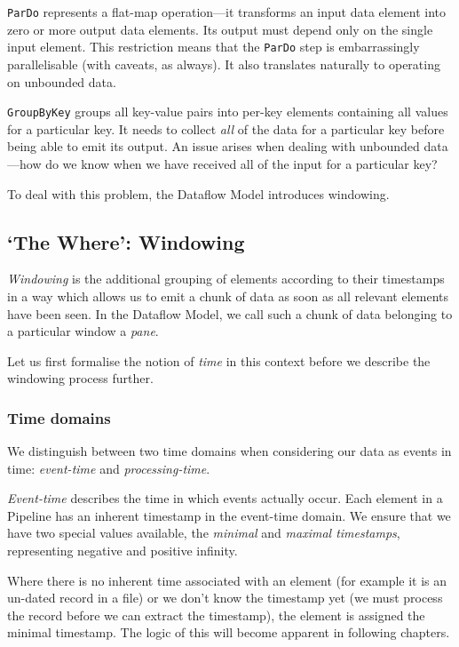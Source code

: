 \verb|ParDo| represents a flat-map operation---it transforms an input data element into zero or more output data elements.
Its output must depend only on the single input element.
This restriction means that the \verb|ParDo| step is embarrassingly parallelisable (with caveats, as always).
It also translates naturally to operating on unbounded data.

\verb|GroupByKey| groups all key-value pairs into per-key elements containing all values for a particular key.
It needs to collect \emph{all} of the data for a particular key before being able to emit its output.
An issue arises when dealing with unbounded data---how do we know when we have received all of the input for a particular key?

To deal with this problem, the Dataflow Model introduces windowing.

\subsection{`The Where': Windowing}\label{sec:prep:dataflow:where}

\emph{Windowing} is the additional grouping of elements according to their timestamps in a way which allows us to emit a chunk of data as soon as all relevant elements have been seen.
In the Dataflow Model, we call such a chunk of data belonging to a particular window a \emph{pane}.

Let us first formalise the notion of \emph{time} in this context before we describe the windowing process further.

\subsubsection{Time domains}


We distinguish between two time domains when considering our data as events in time: \emph{event-time} and \emph{processing-time}.

\emph{Event-time} describes the time in which events actually occur.
Each element in a Pipeline has an inherent timestamp in the event-time domain.
We ensure that we have two special values available, the \emph{minimal} and \emph{maximal timestamps}, representing negative and positive infinity.

Where there is no inherent time associated with an element (for example it is an un-dated record in a file) or we don't know the timestamp yet (we must process the record before we can extract the timestamp), the element is assigned the minimal timestamp.
The logic of this will become apparent in following chapters.

